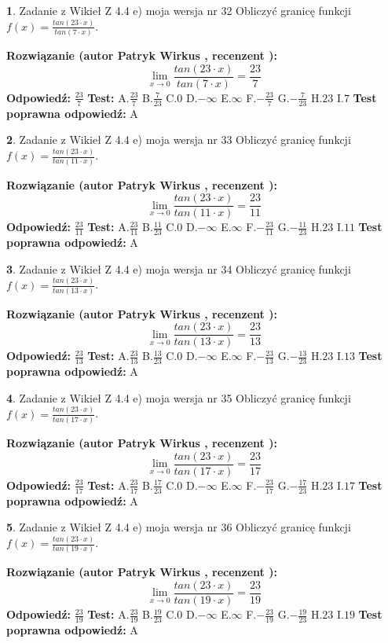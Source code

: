 \documentclass[12pt, a4paper]{article}
\theoremstyle{definition} %
\newtheorem{zad}{}
\newcommand{\zadStart}[1]{\begin{zad}#1\newline}
\newcommand{\zadStop}{\end{zad}}
\newcommand{\rozwStart}[2]{\noindent \textbf{Rozwiązanie (autor #1 , recenzent #2): }\newline}
\newcommand{\rozwStop}{\newline}
\newcommand{\odpStart}{\noindent \textbf{Odpowiedź:}\newline}
\newcommand{\odpStop}{\newline}
\newcommand{\testStart}{\noindent \textbf{Test:}\newline}
\newcommand{\testStop}{\newline}
\newcommand{\kluczStart}{\noindent \textbf{Test poprawna odpowiedź:}\newline}
\newcommand{\kluczStop}{\newline}
\begin{document}
\zadStart{Zadanie z Wikieł Z 4.4 e) moja wersja nr 32}
Obliczyć granicę funkcji $f(x)=\frac{tan(23\cdot x)}{tan(7\cdot x)}$.
\zadStop
\rozwStart{Patryk Wirkus}{}
$$\lim\limits_{x\to 0}\frac{tan(23\cdot x)}{tan(7\cdot x)}=
\frac{23}{7}$$
\rozwStop
\odpStart
$\frac{23}{7}$
\odpStop
\testStart
A.$\frac{23}{7}$
B.$\frac{7}{23}$
C.$0$
D.$-\infty$
E.$\infty$
F.$-\frac{23}{7}$
G.$-\frac{7}{23}$
H.$23$
I.$7$
\testStop
\kluczStart
A
\kluczStop



\zadStart{Zadanie z Wikieł Z 4.4 e) moja wersja nr 33}
Obliczyć granicę funkcji $f(x)=\frac{tan(23\cdot x)}{tan(11\cdot x)}$.
\zadStop
\rozwStart{Patryk Wirkus}{}
$$\lim\limits_{x\to 0}\frac{tan(23\cdot x)}{tan(11\cdot x)}=
\frac{23}{11}$$
\rozwStop
\odpStart
$\frac{23}{11}$
\odpStop
\testStart
A.$\frac{23}{11}$
B.$\frac{11}{23}$
C.$0$
D.$-\infty$
E.$\infty$
F.$-\frac{23}{11}$
G.$-\frac{11}{23}$
H.$23$
I.$11$
\testStop
\kluczStart
A
\kluczStop



\zadStart{Zadanie z Wikieł Z 4.4 e) moja wersja nr 34}
Obliczyć granicę funkcji $f(x)=\frac{tan(23\cdot x)}{tan(13\cdot x)}$.
\zadStop
\rozwStart{Patryk Wirkus}{}
$$\lim\limits_{x\to 0}\frac{tan(23\cdot x)}{tan(13\cdot x)}=
\frac{23}{13}$$
\rozwStop
\odpStart
$\frac{23}{13}$
\odpStop
\testStart
A.$\frac{23}{13}$
B.$\frac{13}{23}$
C.$0$
D.$-\infty$
E.$\infty$
F.$-\frac{23}{13}$
G.$-\frac{13}{23}$
H.$23$
I.$13$
\testStop
\kluczStart
A
\kluczStop



\zadStart{Zadanie z Wikieł Z 4.4 e) moja wersja nr 35}
Obliczyć granicę funkcji $f(x)=\frac{tan(23\cdot x)}{tan(17\cdot x)}$.
\zadStop
\rozwStart{Patryk Wirkus}{}
$$\lim\limits_{x\to 0}\frac{tan(23\cdot x)}{tan(17\cdot x)}=
\frac{23}{17}$$
\rozwStop
\odpStart
$\frac{23}{17}$
\odpStop
\testStart
A.$\frac{23}{17}$
B.$\frac{17}{23}$
C.$0$
D.$-\infty$
E.$\infty$
F.$-\frac{23}{17}$
G.$-\frac{17}{23}$
H.$23$
I.$17$
\testStop
\kluczStart
A
\kluczStop



\zadStart{Zadanie z Wikieł Z 4.4 e) moja wersja nr 36}
Obliczyć granicę funkcji $f(x)=\frac{tan(23\cdot x)}{tan(19\cdot x)}$.
\zadStop
\rozwStart{Patryk Wirkus}{}
$$\lim\limits_{x\to 0}\frac{tan(23\cdot x)}{tan(19\cdot x)}=
\frac{23}{19}$$
\rozwStop
\odpStart
$\frac{23}{19}$
\odpStop
\testStart
A.$\frac{23}{19}$
B.$\frac{19}{23}$
C.$0$
D.$-\infty$
E.$\infty$
F.$-\frac{23}{19}$
G.$-\frac{19}{23}$
H.$23$
I.$19$
\testStop
\kluczStart
A
\kluczStop
\end{document}
